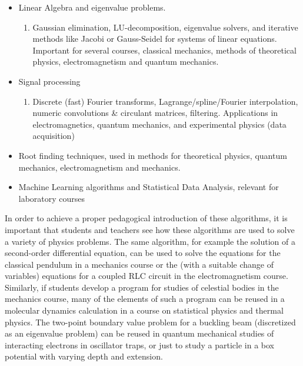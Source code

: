 \documentclass[graybox,envcountchap,sectrefs]{svmult}
\begin{document}
\begin{itemize}
\item Linear Algebra and eigenvalue problems.
\begin{enumerate}

  \item Gaussian elimination, LU-decomposition, eigenvalue solvers, and iterative methods like  Jacobi or Gauss-Seidel for systems of linear equations. Important for several courses, classical mechanics, methods of theoretical physics, electromagnetism and quantum mechanics.

\end{enumerate}


\item Signal processing
\begin{enumerate}

  \item Discrete (fast) Fourier transforms, Lagrange/spline/Fourier interpolation, numeric convolutions {\&} circulant matrices, filtering. Applications in electromagnetics, quantum mechanics, and experimental physics (data acquisition)

\end{enumerate}


\item Root finding techniques, used in methods for theoretical physics, quantum mechanics, electromagnetism and mechanics.

\item Machine Learning algorithms and Statistical Data Analysis, relevant for laboratory courses
\end{itemize}


In order to achieve a proper pedagogical introduction of these
algorithms, it is important that students and teachers see how
these algorithms are used to solve a variety of physics problems. The
same algorithm, for example the solution of a second-order
differential equation, can be used to solve the equations for the
classical pendulum in a mechanics course or the (with a suitable
change of variables) equations for a coupled RLC circuit in the
electromagnetism course. Similarly, if students develop a program for
studies of celestial bodies in the mechanics course, many of the
elements of such a program can be reused in a molecular dynamics
calculation in a course on statistical physics and thermal
physics. The two-point boundary value problem for a buckling beam
(discretized as an eigenvalue problem) can be reused in quantum
mechanical studies of interacting electrons in oscillator traps, or
just to study a particle in a box potential with varying depth and
extension.
\end{document}
